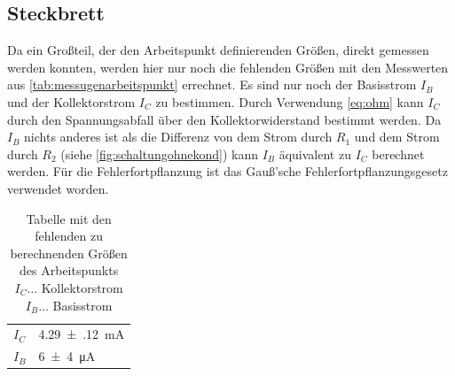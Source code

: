 \documentclass[12pt,english,ngerman]{scrartcl}
\begin{document}
\subsection{Steckbrett}



Da ein Großteil, der den Arbeitspunkt definierenden Größen, direkt gemessen werden
konnten, werden hier nur noch die fehlenden Größen mit den Messwerten aus
\autoref{tab:messugenarbeitspunkt} errechnet. Es sind nur noch der Basisstrom
$I_B$ und der Kollektorstrom $I_C$ zu bestimmen. Durch Verwendung
\autoref{eq:ohm} kann $I_C$ durch den Spannungsabfall über den
Kollektorwiderstand bestimmt werden. Da $I_B$ nichts anderes ist als die
Differenz von dem Strom durch $R_1$ und dem Strom durch $R_2$ (siehe
\autoref{fig:schaltungohnekond}) kann $I_B$ äquivalent zu $I_C$ berechnet
werden. Für die Fehlerfortpflanzung ist das Gauß'sche Fehlerfortpflanzungsgesetz
verwendet worden.

\begin{table}[H]
  \caption{ Tabelle mit den fehlenden zu berechnenden Größen des Arbeitspunkts \\
  $I_C \dots$ Kollektorstrom \\
  $I_B \dots$ Basisstrom 
  }
  \label{tab:aus_arbeitspunkt_daten}
  \centering
  \begin{tabular}[c]{l|l}
    $I_C$ & \SI{4.29(12)}{\milli\ampere} \\
    $I_B$ & \SI{6(4)}{\micro\ampere} \\
  \end{tabular}
\end{table}


\end{document}
